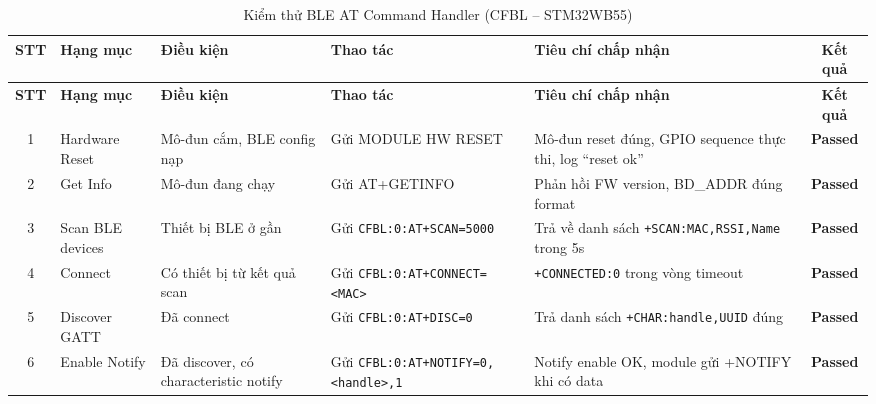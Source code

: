         \begin{longtable}{|c|p{2cm}|p{2.5cm}|p{3.5cm}|p{4cm}|c|}
            \caption{Kiểm thử BLE AT Command Handler (CFBL -- STM32WB55)}
            \label{tab:test_ble_at_handler} \\
            \hline
            \textbf{STT} & \textbf{Hạng mục} & \textbf{Điều kiện} & \textbf{Thao tác} & \textbf{Tiêu chí chấp nhận} & \textbf{Kết quả} \\ \hline
            \endfirsthead
            \hline
            \textbf{STT} & \textbf{Hạng mục} & \textbf{Điều kiện} & \textbf{Thao tác} & \textbf{Tiêu chí chấp nhận} & \textbf{Kết quả} \\ \hline
            \endhead
            \hline
            \endfoot
            \endlastfoot
        
            1 & Hardware Reset & Mô-đun cắm, BLE config nạp & Gửi MODULE HW RESET & Mô-đun reset đúng, GPIO sequence thực thi, log ``reset ok'' & \textcolor{modern_blue}{\textbf{Passed}} \\ \hline
            2 & Get Info & Mô-đun đang chạy & Gửi AT+GETINFO & Phản hồi FW version, BD\_ADDR đúng format & \textcolor{modern_blue}{\textbf{Passed}} \\ \hline
            3 & Scan BLE devices & Thiết bị BLE ở gần & Gửi \texttt{CFBL:0:}\newline\texttt{AT+SCAN=5000} & Trả về danh sách \texttt{+SCAN:MAC,RSSI,}\newline\texttt{Name} trong 5s & \textcolor{modern_blue}{\textbf{Passed}} \\ \hline
            4 & Connect & Có thiết bị từ kết quả scan & Gửi \texttt{CFBL:0:}\newline\texttt{AT+CONNECT=}\newline\texttt{<MAC>} & \texttt{+CONNECTED:0} trong vòng timeout & \textcolor{modern_blue}{\textbf{Passed}} \\ \hline
            5 & Discover GATT & Đã connect & Gửi \texttt{CFBL:0:}\newline\texttt{AT+DISC=0} & Trả danh sách \texttt{+CHAR:}\newline\texttt{handle,UUID} đúng & \textcolor{modern_blue}{\textbf{Passed}} \\ \hline
            6 & Enable Notify & Đã discover, có characteristic notify & Gửi \texttt{CFBL:0:}\newline\texttt{AT+NOTIFY=0,}\newline\texttt{<handle>,1} & Notify enable OK, module gửi +NOTIFY khi có data & \textcolor{modern_blue}{\textbf{Passed}} \\ \hline

\end{longtable}
